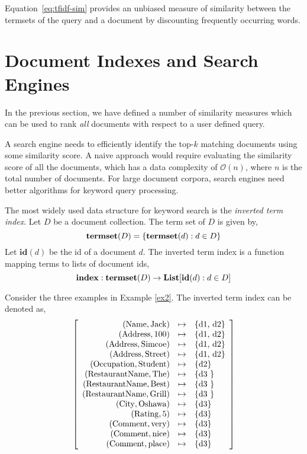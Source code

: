 Equation~\ref{eq:tfidf-sim} provides an unbiased measure of similarity between the termsets of the query and a document by discounting frequently occurring words.

\section{Document Indexes and Search Engines}
In the previous section, we have defined a number of similarity measures which can be used to rank {\em all} documents with respect to a user defined query.

A search engine needs to efficiently identify the top-$k$ matching documents using some similarity score.  A naive approach would require evaluating the similarity score of all the documents, which has a data complexity of $\mathcal{O}(n)$, where $n$ is the total number of documents.  For large document corpora, search engines need better algorithms for keyword query processing.

\newcommand{\Id}{\mathbf{id}}
\newcommand{\Idset}{\mathbf{idset}}

The most widely used data structure for keyword search is the {\em inverted term index}. 
Let $D$ be a document collection. The term set of $D$ is given by,
$$
\mathbf{termset}(D) = \{\mathbf{termset}(d):  d \in D\}
$$
Let $\Id(d)$ be the id of a document $d$. The inverted term index is a function mapping terms to lists of document ids,
$$
\mathbf{index} : \Termset(D) \to \List[\Id(d): d \in D]
$$

\begin{example}
Consider the three examples in Example \ref{ex2}. The inverted term index can be denoted as,
$$
\left[\begin{array}{rcl}
	\mathrm{(Name, Jack)} & \mapsto & \makebox{\{d1, d2\}}  \\
	\mathrm{(Address, 100)} & \mapsto & \makebox{\{d1, d2\}}  \\
	\mathrm{(Address, Simcoe)} & \mapsto & \makebox{\{d1, d2\}}  \\
	\mathrm{(Address, Street)} & \mapsto & \makebox{\{d1, d2\}}  \\
	\mathrm{(Occupation, Student)} & \mapsto & \makebox{\{d2\}}  \\
	\mathrm{(RestaurantName, The)} & \mapsto & \makebox{\{d3 \}}  \\
	\mathrm{(RestaurantName, Best)} & \mapsto & \makebox{\{d3 \}}  \\
	\mathrm{(RestaurantName, Grill)} & \mapsto & \makebox{\{d3 \}}  \\
	\mathrm{(City, Oshawa)} & \mapsto & \makebox{\{d3\}}  \\
	\mathrm{(Rating, 5)} & \mapsto & \makebox{\{d3\}}  \\
	\mathrm{(Comment, very)} & \mapsto & \makebox{\{d3\}}  \\
	\mathrm{(Comment, nice)} & \mapsto & \makebox{\{d3\}}  \\
	\mathrm{(Comment, place)} & \mapsto & \makebox{\{d3\}}  \\
\end{array}\right]
$$
\end{example}

